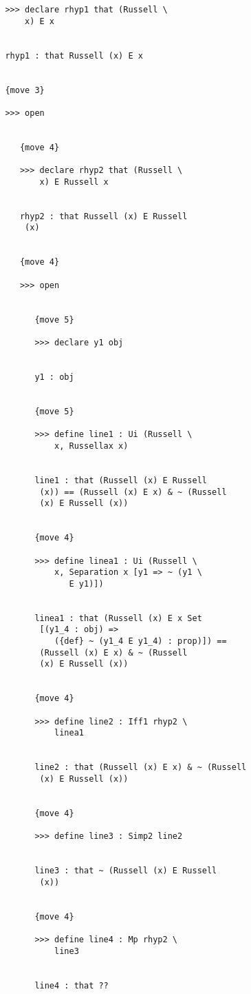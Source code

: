 \documentclass[12pt]{article}
\begin{document}
\begin{verbatim}
         >>> declare rhyp1 that (Russell \
             x) E x


         rhyp1 : that Russell (x) E x


         {move 3}

         >>> open


            {move 4}

            >>> declare rhyp2 that (Russell \
                x) E Russell x


            rhyp2 : that Russell (x) E Russell 
             (x)


            {move 4}

            >>> open


               {move 5}

               >>> declare y1 obj


               y1 : obj


               {move 5}

               >>> define line1 : Ui (Russell \
                   x, Russellax x)


               line1 : that (Russell (x) E Russell 
                (x)) == (Russell (x) E x) & ~ (Russell 
                (x) E Russell (x))


               {move 4}

               >>> define linea1 : Ui (Russell \
                   x, Separation x [y1 => ~ (y1 \
                      E y1)])


               linea1 : that (Russell (x) E x Set 
                [(y1_4 : obj) => 
                   ({def} ~ (y1_4 E y1_4) : prop)]) == 
                (Russell (x) E x) & ~ (Russell 
                (x) E Russell (x))


               {move 4}

               >>> define line2 : Iff1 rhyp2 \
                   linea1


               line2 : that (Russell (x) E x) & ~ (Russell 
                (x) E Russell (x))


               {move 4}

               >>> define line3 : Simp2 line2


               line3 : that ~ (Russell (x) E Russell 
                (x))


               {move 4}

               >>> define line4 : Mp rhyp2 \
                   line3


               line4 : that ??



\end{verbatim}
\end{document}
